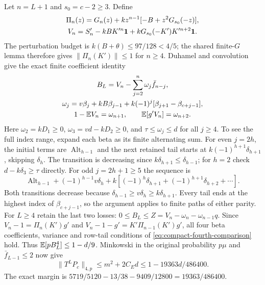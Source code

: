 Let $n=L+1$ and $s_0=c-2\ge3$. Define
\begin{gather*}
 \Pi_n(z)=G_n(z)+kz^{n-1}[-B+z^2G_{s_0}(-z)],\\
 V_n=S'_n-kB K'^n\mathbf1+kG_{s_0}(-K')K'^{n+2}\mathbf1.
\end{gather*}
The perturbation budget is
$k(B+\theta)\le97/128<4/5$; the shared finite-$G$ lemma therefore gives
$\|\Pi_n(K')\|\le1$ for $n\ge4$.
Duhamel and convolution give the exact finite coefficient identity
\begin{gather*}
 B_L=V_n-\sum_{j=2}^n\omega_j\bar f_{n-j},\\
 \omega_j=v\beta_j+kB\beta_{j-1}
                +k(-1)^j[\beta_{j+1}-\beta_{c+j-1}],\\
 1-\mathbb E V_n=\omega_{n+1},\qquad\mathbb E[g'V_n]=\omega_{n+2}.
\end{gather*}
Here $\omega_2=kD_1\ge0$, $\omega_3=vd-kD_2\ge0$,
and $\tau\le\omega_j\le d$ for all $j\ge4$.
To see the full index range, expand each beta as its finite alternating
sum. For even $j=2h$, the initial terms are
$\operatorname{Alt}_{h-1}$ and the next retained tail starts at
$k(-1)^{h+1}\delta_{h+1}$, skipping $\delta_{h}$.
The transition is decreasing since $k\delta_{h+1}\le \delta_{h-1}$;
for $h=2$ check $d-k\delta_{3}\ge\tau$ directly.
For odd $j=2h+1\ge5$ the sequence is
\[
 \operatorname{Alt}_{h-1}+(-1)^{h-1}v\delta_{h}
       +k[(-1)^h\delta_{h+1}+(-1)^{h+1}\delta_{h+2}+\cdots].
\]
Both transitions decrease because $\delta_{h-1}\ge v\delta_{h}\ge k\delta_{h+1}$.
Every tail ends at the highest index of $\beta_{c+j-1}$, so the argument
applies to finite paths of either parity.
For $L\ge4$ retain the last two losses:
$0\le B_L\le Z=V_n-\omega_n-\omega_{n-1}q$.
Since $V_n-1=\Pi_n(K')g'$ and
$V_n-1-g'=K'\Pi_{n-1}(K')g'$, all four beta coefficients, variance and
row-tail conditions of \eqref{eq:compact-fourth-comparison} hold.
Thus $\mathbb E[pB_L^4]\le1-d/9$.
Minkowski in the original probability $p\mu$ and $\bar f_{L-1}\le2$ now give
\[
 \|T^LP_c\|_{4,p}\le m^2+2C_Ed
 \le1-19363d/486400.
\]
The exact margin is
$5719/5120-13/38-9409/12800=19363/486400$.

